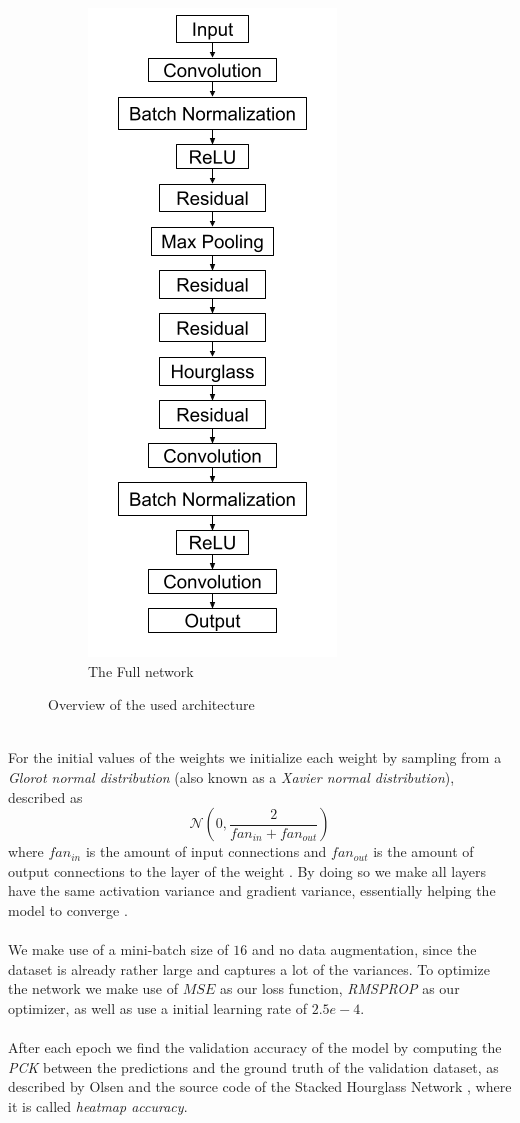 \documentclass[./main.tex]{subfiles}
\begin{document}
\begin{figure}[p]
\begin{subfigure}{5 cm}
        \centering
        \includegraphics[width = 4 cm]{entities/SHG_drawing.png}
        \caption{The Full network}
    \end{subfigure}
    \caption{Overview of the used architecture}
    \label{fig:architecture}
\end{figure}
\\
For the initial values of the weights we initialize each weight by sampling from a \textit{Glorot normal distribution} (also known as a \textit{Xavier normal distribution}), described as
$$\mathcal{N} \left(0, \frac{2}{fan_{in} + fan_{out}} \right)$$
where $fan_{in}$ is the amount of input connections and $fan_{out}$ is the amount of output connections to the layer of the weight \cite{Xavier}. By doing so we make all layers have the same activation variance and gradient variance, essentially helping the model to converge \cite{DeepLearning}.
\\
\\
We make use of a mini-batch size of $16$ and no data augmentation, since the dataset is already rather large and captures a lot of the variances. To optimize the network we make use of $MSE$ as our loss function, \textit{RMSPROP} as our optimizer, as well as use a initial learning rate of $2.5e-4$. 
\\
\\
After each epoch we find the validation accuracy of the model by computing the \textit{PCK} between the predictions and the ground truth of the validation dataset, as described by Olsen \cite{Camilla} and the source code of the Stacked Hourglass Network \cite{SHG}, where it is called \textit{heatmap accuracy}.
\end{document}
